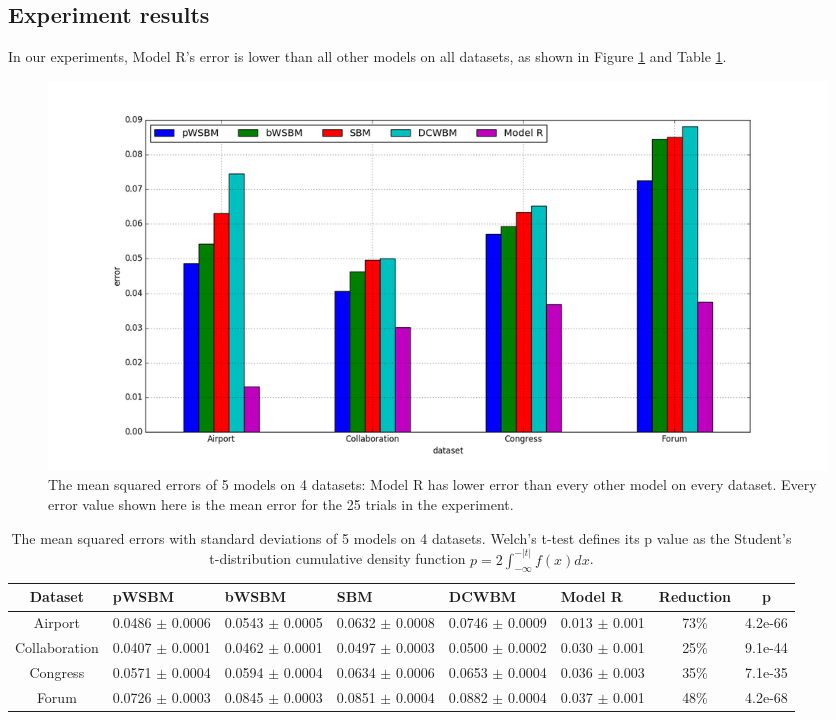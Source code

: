 \documentclass[11pt,twocolumn]{article}
\begin{document}
\subsection{Experiment results}
In our experiments,
Model R's error is lower than all other models on all datasets,
as shown in Figure \ref{fig:errors} and Table \ref{tab:errors}.
\begin{figure}[!ht]\centering
	\includegraphics[width=1\textwidth]{link-weight-errors}
	\caption{
		The mean squared errors of 5 models on 4 datasets:
		Model R has lower error than every other model on every dataset.
		Every error value shown here is the mean error for the 25 trials in the experiment.
	}
	\label{fig:errors}
\end{figure}
\begin{table}[!htb]\centering
	\caption{
		The mean squared errors with standard deviations of 5 models on 4 datasets.
		Welch's t-test defines its p value as the Student's t-distribution cumulative density function $ p = 2 \int_{-\infty}^{-|t|} f(x) dx $.
	}
	\begin{tabularx}{\textwidth}{|c|X|X|X|X|X|c|c|} \hline \rowcolor{blue!30}
		Dataset & pWSBM & bWSBM & SBM & DCWBM & Model R & Reduction & p \\ \hline
		Airport & 0.0486 $ \pm $ 0.0006 & 0.0543 $ \pm $ 0.0005 & 0.0632 $ \pm $ 0.0008 & 0.0746 $ \pm $ 0.0009 & 0.013 $ \pm $ 0.001 & 73\% & 4.2e-66 \\ \hline
		Collaboration & 0.0407 $ \pm $ 0.0001 & 0.0462 $ \pm $ 0.0001 & 0.0497 $ \pm $ 0.0003 & 0.0500 $ \pm $ 0.0002 & 0.030 $ \pm $ 0.001 & 25\% & 9.1e-44 \\ \hline
		Congress & 0.0571 $ \pm $ 0.0004 & 0.0594 $ \pm $ 0.0004 & 0.0634 $ \pm $ 0.0006 & 0.0653 $ \pm $ 0.0004 & 0.036 $ \pm $ 0.003 & 35\% & 7.1e-35 \\ \hline
		Forum & 0.0726 $ \pm $ 0.0003 & 0.0845 $ \pm $ 0.0003 & 0.0851 $ \pm $ 0.0004 & 0.0882 $ \pm $ 0.0004 & 0.037 $ \pm $ 0.001 & 48\% & 4.2e-68 \\ \hline
	\end{tabularx}
	\label{tab:errors}
\end{table}
\end{document}
